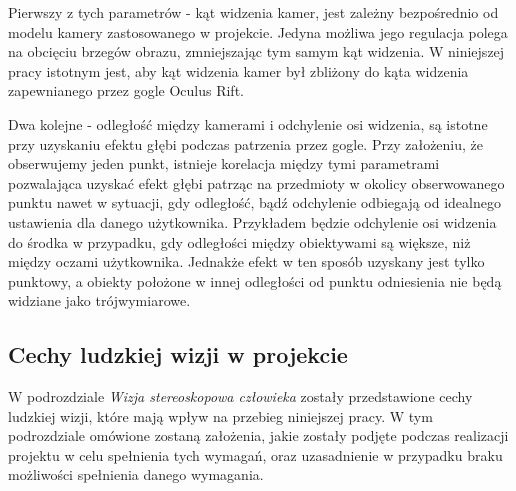 \documentclass[a4paper,11pt,twoside]{report}
\theoremstyle{definition}
\begin{document}
Pierwszy z tych parametrów - kąt widzenia kamer, jest zależny bezpośrednio od modelu kamery zastosowanego w projekcie. Jedyna możliwa jego regulacja polega na obcięciu brzegów obrazu, zmniejszając tym samym kąt widzenia. W niniejszej pracy istotnym jest, aby kąt widzenia kamer był zbliżony do kąta widzenia zapewnianego przez gogle Oculus Rift.

Dwa kolejne - odległość między kamerami i odchylenie osi widzenia, są istotne przy uzyskaniu efektu głębi podczas patrzenia przez gogle. Przy założeniu, że obserwujemy jeden punkt, istnieje korelacja między tymi parametrami pozwalająca uzyskać efekt głębi patrząc na przedmioty w okolicy obserwowanego punktu nawet w sytuacji, gdy odległość, bądź odchylenie odbiegają od idealnego ustawienia dla danego użytkownika. Przykładem będzie odchylenie osi widzenia do środka w przypadku, gdy odległości między obiektywami są większe, niż między oczami użytkownika. Jednakże efekt w ten sposób uzyskany jest tylko punktowy, a obiekty położone w innej odległości od punktu odniesienia nie będą widziane jako trójwymiarowe.

\subsection{Cechy ludzkiej wizji w projekcie}

W podrozdziale \textit{Wizja stereoskopowa człowieka} zostały przedstawione cechy ludzkiej wizji, które mają wpływ na przebieg niniejszej pracy. W tym podrozdziale omówione zostaną założenia, jakie zostały podjęte podczas realizacji projektu w celu spełnienia tych wymagań, oraz uzasadnienie w przypadku braku możliwości spełnienia danego wymagania.
\end{document}
